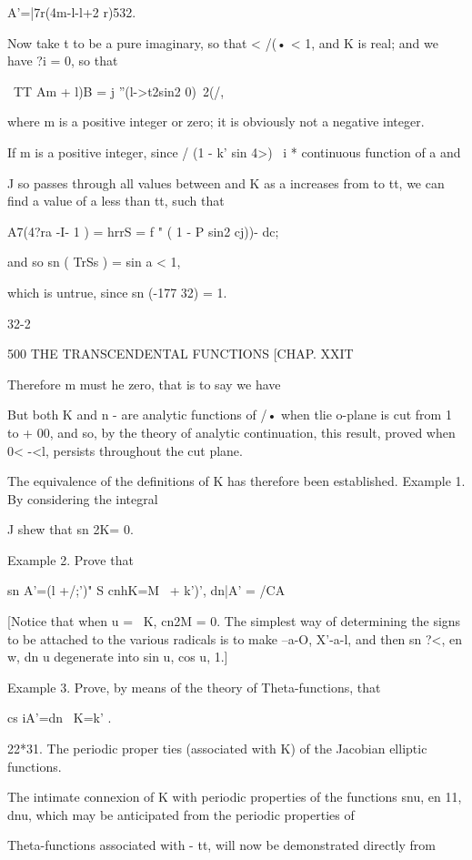 A'=|7r(4m-l-l+2 r)532.

Now take t to be a pure imaginary, so that < /(• < 1, and K is real;
and we have ?i = 0, so that

\ TT Am + l)B = j ''(l->t2sin2 0)~2(/,

where m is a positive integer or zero; it is obviously not a negative
integer.

If m is a positive integer, since / (1 - k' sin 4>)~ i * continuous
function of a and

J so passes through all values between and K as a increases from to
tt, we can find a value of a less than tt, such that

A7(4?ra -I- 1 ) = hrrS = f " ( 1 - P sin2 cj))- dc;

and so sn ( TrSs ) = sin a < 1,

which is untrue, since sn (-177 32) = 1.

32-2

500 THE TRANSCENDENTAL FUNCTIONS [CHAP. XXIT

Therefore m must he zero, that is to say we have

But both K and n - are analytic functions of /• when tlie o-plane is
cut from 1 to + 00, and so, by the theory of analytic continuation,
this result, proved when 0< -<l, persists throughout the cut plane.

The equivalence of the definitions of K has therefore been
established. Example 1. By considering the integral

J shew that sn 2K= 0.

Example 2. Prove that

sn A'=(l +/;')" S cnhK=M \ + k')', dn|A' = /CA

[Notice that when u = \ K, cn2M = 0. The simplest way of determining
the signs to be attached to the various radicals is to make --a-O,
X'-a-l, and then sn ?<, en w, dn u degenerate into sin u, cos u, 1.]

Example 3. Prove, by means of the theory of Theta-functions, that

cs iA'=dn \ K=k' .

22*31. The periodic proper ties (associated with K) of the Jacobian
elliptic functions.

The intimate connexion of K with periodic properties of the functions
snu, en 11, dnu, which may be anticipated from the periodic properties
of

Theta-functions associated with - tt, will now be demonstrated
directly from


